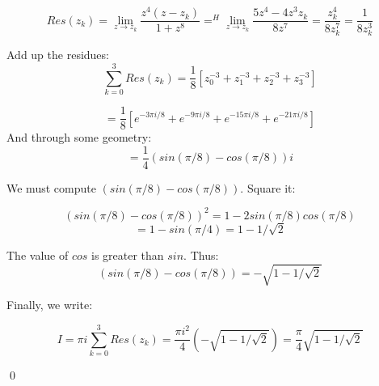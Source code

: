 \documentclass{article}
\begin{document}
\[
    Res(z_k) = 
    \lim_{z\rightarrow z_k}
    \frac{z^4(z-z_k)}{1+z^8}
    =^H
\lim_{z\rightarrow z_k}
    \frac{5z^4-4z^3z_k}{8z^7}
    = \frac{z_k^4}{8z_k^7}
    = \frac{1}{8z_k^3}
\]

Add up the residues:
\[
    \sum_{k = 0}^{3}Res(z_k)
     =
     \frac{1}{8}
     [z_0^{-3}+z_1^{-3}+z_2^{-3}+z_3^{-3}]
\]

\[
    = \frac{1}{8}
    [e^{-3\pi i/8}+ e^{-9\pi i/8}+ e^{-15\pi i/8}+ e^{-21\pi i/8}]
\]
And through some geometry:
\[
    = \frac{1}{4}(sin(\pi/8)-cos(\pi/8))i
\]

We must compute $(sin(\pi/8)-cos(\pi/8))$. 
Square it:

\[
    (sin(\pi/8)-cos(\pi/8))^2 = 
    1-2sin(\pi/8)cos(\pi/8)
\]
\[
    = 1- sin(\pi/4) = 1- 1/\sqrt{2}
\]

The value of $cos$ is greater than $sin$. Thus:
\[
    (sin(\pi/8)-cos(\pi/8)) = -\sqrt{1- 1/\sqrt{2}}
\]

Finally, we write:

\[
    I = \pi i \sum_{k = 0}^{3}Res(z_k)
    =\frac{ \pi i^2}{4} (-\sqrt{1- 1/\sqrt{2}})
    = \frac{\pi}{4} \sqrt{1- 1/\sqrt{2}}
\]

\qed
\end{document}
